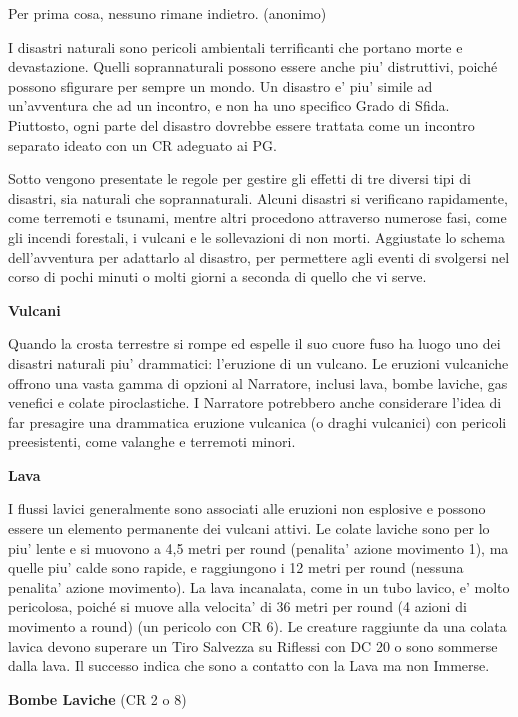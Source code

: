 \documentclass[a4paper,11pt,twoside,openany]{dndbook}
\begin{document}
{\label{avventure-e-disastri}
\begin{quotebox}
Per prima cosa, nessuno rimane indietro. (anonimo)
\end{quotebox}
I disastri naturali sono pericoli ambientali terrificanti che portano morte e devastazione. Quelli soprannaturali posso­no essere anche piu' distruttivi, poiché possono sfigurare per sempre un mondo. Un disastro e' piu' simile ad un'avventura che ad un incontro, e non ha uno specifico Grado di Sfida. Piuttosto, ogni parte del disastro dovrebbe essere trattata come un incontro separato ideato con un CR adeguato ai PG.

Sotto vengono presentate le regole per gestire gli effetti di tre diversi tipi di disastri, sia naturali che soprannaturali. Alcuni disastri si verificano rapidamente, come terremoti e tsunami, mentre altri procedono attraverso numerose fasi, come gli incendi forestali, i vulcani e le sollevazioni di non morti. Aggiustate lo schema dell'avventura per adattarlo al disastro, per permettere agli eventi di svolgersi nel corso di pochi minuti o molti giorni a seconda di quello che vi serve.

\textbf{Vulcani}

Quando la crosta terrestre si rompe ed espelle il suo cuore fuso ha luogo uno dei disastri naturali piu' drammatici: l'eruzione di un vulcano. Le eruzioni vulcaniche offrono una vasta gamma di opzioni al Narratore, inclusi lava, bombe laviche, gas venefici e colate piroclastiche. I Narratore potrebbero anche considerare l'idea di far presagire una drammatica eruzione vulcanica (o draghi vulcanici) con pericoli preesistenti, come valanghe e terremoti minori.

\textbf{Lava}

I flussi lavici generalmente sono associati alle eruzioni non esplosive e possono essere un elemento permanente dei vulcani attivi. Le colate laviche sono per lo piu' lente e si muovono a 4,5 metri per round (penalita' azione movimento 1), ma quelle piu' calde sono rapide, e raggiungono i 12 metri per round (nessuna penalita' azione movimento). La lava incanalata, come in un tubo lavico, e' molto pericolosa, poiché si muove alla velocita' di 36 metri per round (4 azioni di movimento a round) (un pericolo con CR 6). Le creature raggiunte da una colata lavica devono superare un Tiro Salvezza su Riflessi con DC 20 o sono sommerse dalla lava. Il successo indica che sono a contatto con la Lava ma non Immerse.

\textbf{Bombe Laviche} (CR 2 o 8)

}
\end{document}

